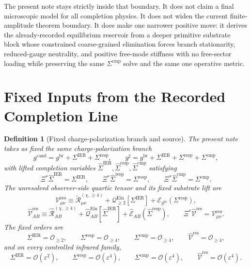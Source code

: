 \documentclass[11pt]{article}
\newcommand{\ObserverMap}{\Xi}
\newcommand{\ObserverMetric}{g^{\mathrm{br}}}
\newcommand{\CandidateMetric}{g^{\mathrm{cand}}}
\newcommand{\CompletedMetric}{g^{\sharp}}
\newcommand{\BaseShift}{\Sigma^{\mathrm{IER}}}
\newcommand{\ResponseShift}{\Sigma^{\mathrm{resp}}}
\newcommand{\CompShift}{\Sigma^{\mathrm{cmp}}}
\newcommand{\BaseLift}{\widehat\Sigma^{\mathrm{IER}}}
\newcommand{\ResponseLift}{\widehat\Sigma^{\mathrm{resp}}}
\newcommand{\CompLift}{\widehat\Sigma^{\mathrm{cmp}}}
\newcommand{\ReLongFour}{\widetilde{\mathcal R}_{\mu\nu}^{(\chi,\ge 4)}}
\newcommand{\ResidualCore}{\mathcal V_{\mu\nu}^{\mathrm{res}}}
\newcommand{\ResidualLift}{\widehat{\mathcal V}^{\mathrm{res}}}
\newcommand{\EinLin}{\mathcal E_{\ObserverMetric}}
\newcommand{\EinQuad}{\mathcal Q_{\ge 2}^{\mathrm{Ein}}}
\newcommand{\epsIR}{\varepsilon}
\newtheorem{definition}{Definition}
\begin{document}
The present note stays strictly inside that boundary. It does not claim a final microscopic model for all completion physics. It does not widen the current finite-amplitude theorem boundary. It does make one narrower positive move: it derives the already-recorded equilibrium reservoir from a deeper primitive substrate block whose constrained coarse-grained elimination forces branch stationarity, reduced-gauge neutrality, and positive free-mode stiffness with no free-sector loading while preserving the same \(\Sigma^{\mathrm{cmp}}\) solve and the same one operative metric.

\section{Fixed Inputs from the Recorded Completion Line}

\begin{definition}[Fixed charge-polarization branch and source]
\label{def:fixed}
The present note takes as fixed the same charge-polarization branch
\begin{equation}
\CandidateMetric
=
\ObserverMetric+\BaseShift+\ResponseShift,
\qquad
\CompletedMetric
=
\ObserverMetric+\BaseShift+\ResponseShift+\CompShift,
\label{eq:metrics}
\end{equation}
with lifted completion variables \(\BaseLift,\ResponseLift,\CompLift\) satisfying
\begin{equation}
\ObserverMap^*\BaseLift=\BaseShift,
\qquad
\ObserverMap^*\ResponseLift=\ResponseShift,
\qquad
\ObserverMap^*\CompLift=\CompShift.
\label{eq:lifts}
\end{equation}
The unresolved observer-side quartic tensor and its fixed substrate lift are
\begin{equation}
\ResidualCore
\equiv
\ReLongFour
+\EinQuad[\BaseShift]
+\EinLin(\ResponseShift),
\label{eq:vres}
\end{equation}
\begin{equation}
\ResidualLift_{AB}
\equiv
\widehat{\mathcal R}_{AB}^{(\chi,\ge 4)}
+\widehat{\mathcal Q}_{AB}^{\mathrm{Ein}}[\BaseLift]
+\widehat{\mathcal E}_{AB}(\ResponseLift),
\qquad
\ObserverMap^*\ResidualLift=\ResidualCore.
\label{eq:liftedsource}
\end{equation}
The fixed orders are
\begin{equation}
\BaseShift=\mathcal O_{\ge 2},
\qquad
\ResponseShift=\mathcal O_{\ge 4},
\qquad
\CompShift=\mathcal O_{\ge 4},
\qquad
\ResidualLift=\mathcal O_{\ge 4},
\label{eq:orders}
\end{equation}
and on every controlled infrared family,
\begin{equation}
\BaseShift=\mathcal O(\epsIR^2),
\qquad
\ResponseShift=\mathcal O(\epsIR^4),
\qquad
\CompShift=\mathcal O(\epsIR^4),
\qquad
\ResidualLift=\mathcal O(\epsIR^4).
\label{eq:irorders}
\end{equation}
\end{definition}
\end{document}
